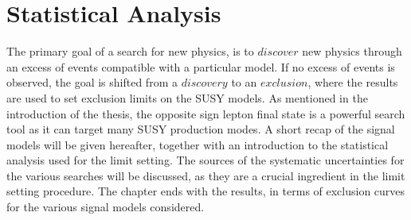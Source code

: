 \chapter{Statistical Analysis}\label{sec:stats}
\noindent
\justify
The primary goal of a search for new physics, is to $discover$ new physics through an excess of events compatible with a particular model. 
If no excess of events is observed, the goal is shifted from a $discovery$ to an $exclusion$, where the results are used to set exclusion limits on the SUSY models.
As mentioned in the introduction of the thesis, the opposite sign lepton final state is a powerful search tool as it can target many SUSY production modes. 
A short recap of the signal models will be given hereafter, together with an introduction to the statistical analysis used for the limit setting.
The sources of the systematic uncertainties for the various searches will be discussed, as they are a crucial ingredient in the limit setting procedure. 
The chapter ends with the results, in terms of exclusion curves for the various signal models considered.
\newpage
